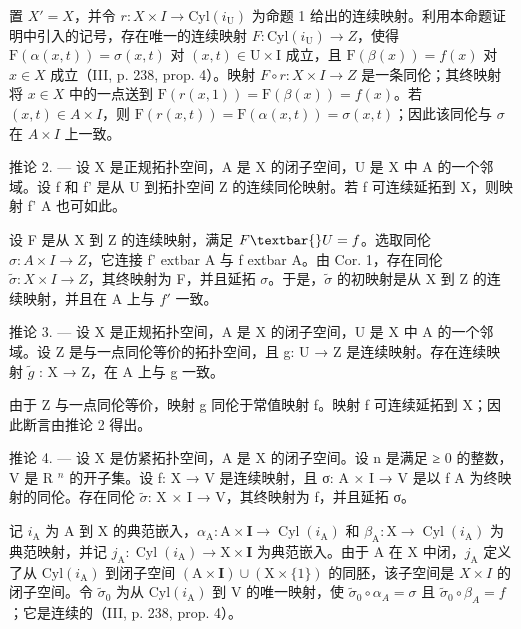 置 \(X' = X\)，并令 \(r: X \times I \to \text{Cyl}(i_{\text{U}})\) 为命题 1 给出的连续映射。利用本命题证明中引入的记号，存在唯一的连续映射 \(F: \text{Cyl}(i_{\text{U}}) \to Z\)，使得 \(\text{F}(\alpha(x,t)) = \sigma(x,t)\) 对 \((x,t) \in \text{U} \times \text{I}\) 成立，且 \(\text{F}(\beta(x)) = f(x)\) 对 \(x \in X\) 成立（III, p. 238, prop. 4）。映射 \(F \circ r: X \times I \to Z\) 是一条同伦；其终映射将 \(x \in X\) 中的一点送到 \(\text{F}(r(x,1)) = \text{F}(\beta(x)) = f(x)\)。若 \((x,t) \in A \times I\)，则 \(\text{F}(r(x,t)) = \text{F}(\alpha(x,t)) = \sigma(x,t)\)；因此该同伦与 \(\sigma\) 在 \(A \times I\) 上一致。

推论 2. --- 设 X 是正规拓扑空间，A 是 X 的闭子空间，U 是 X 中 A 的一个邻域。设 f 和 f' 是从 U 到拓扑空间 Z 的连续同伦映射。若 f 可连续延拓到 X，则映射 f' \textbar{} A 也可如此。

设 F 是从 X 到 Z 的连续映射，满足 \(F \textbar{} U = f\)。选取同伦 \(\sigma\colon A \times I \to Z\)，它连接 f'	extbar{} A 与 f	extbar{} A。由 Cor. 1，存在同伦 \(\widetilde{\sigma}\colon X \times I \to Z\)，其终映射为 F，并且延拓 \(\sigma\)。于是，\(\widetilde{\sigma}\) 的初映射是从 X 到 Z 的连续映射，并且在 A 上与 \(f'\) 一致。

推论 3. — 设 X 是正规拓扑空间，A 是 X 的闭子空间，U 是 X 中 A 的一个邻域。设 Z 是与一点同伦等价的拓扑空间，且 g: U → Z 是连续映射。存在连续映射 \(\widetilde{g}\) : X → Z，在 A 上与 g 一致。

由于 Z 与一点同伦等价，映射 g 同伦于常值映射 f。映射 f 可连续延拓到 X；因此断言由推论 2 得出。

推论 4. --- 设 X 是仿紧拓扑空间，A 是 X 的闭子空间。设 n 是满足 ≥ 0 的整数，V 是 R \(^{n}\) 的开子集。设 f: X → V 是连续映射，且 σ: A × I → V 是以 f \textbar{} A 为终映射的同伦。存在同伦 \(\widetilde{\sigma}\): X × I → V，其终映射为 f，并且延拓 σ。

记 \(i_{\mathrm{A}}\) 为 A 到 X 的典范嵌入，\(\alpha_{\mathrm{A}}: \mathrm{A} \times \mathbf{I} \to \operatorname{Cyl}(i_{\mathrm{A}})\) 和 \(\beta_{\mathrm{A}}: \mathrm{X} \to \operatorname{Cyl}(i_{\mathrm{A}})\) 为典范映射，并记 \(j_{\mathrm{A}}: \operatorname{Cyl}(i_{\mathrm{A}}) \to \mathrm{X} \times \mathbf{I}\) 为典范嵌入。由于 A 在 X 中闭，\(j_{\mathrm{A}}\) 定义了从 \(\mathrm{Cyl}(i_{\mathrm{A}})\) 到闭子空间 \((\mathrm{A}\times\mathbf{I})\cup(\mathrm{X}\times\{1\})\) 的同胚，该子空间是 \(X\times I\) 的闭子空间。令 \(\widetilde{\sigma}_{0}\) 为从 \(\mathrm{Cyl}(i_{\mathrm{A}})\) 到 V 的唯一映射，使 \(\widetilde{\sigma}_{0}\circ\alpha_{A}=\sigma\) 且 \(\widetilde{\sigma}_{0}\circ\beta_{A}=f\)；它是连续的（III, p. 238, prop. 4）。

